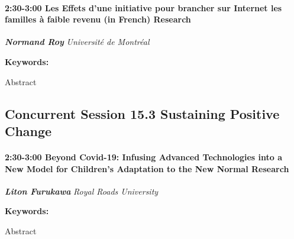 \documentclass[
]{book}
\begin{document}
\begin{session}
\hypertarget{les-effets-dune-initiative-pour-brancher-sur-internet-les-familles-uxe0-faible-revenu-in-french-research}{%
\paragraph*{\texorpdfstring{2:30-3:00 \textbar{} \textbf{Les Effets
d'une initiative pour brancher sur Internet les familles à faible revenu
(in French)} \textbar{}
Research}{2:30-3:00 \textbar{} Les Effets d'une initiative pour brancher sur Internet les familles à faible revenu (in French) \textbar{} Research}}\label{les-effets-dune-initiative-pour-brancher-sur-internet-les-familles-uxe0-faible-revenu-in-french-research}}

\textbf{\emph{Normand Roy}} \textbar{} \emph{Université de Montréal}

\textbf{Keywords:}

Abstract
\end{session}

\hypertarget{concurrent-session-15.3-sustaining-positive-change}{%
\subsection*{Concurrent Session 15.3 \textbar{} Sustaining Positive Change}\label{concurrent-session-15.3-sustaining-positive-change}}

\begin{session}
\hypertarget{beyond-covid-19-infusing-advanced-technologies-into-a-new-model-for-childrens-adaptation-to-the-new-normal-research}{%
\paragraph*{\texorpdfstring{2:30-3:00 \textbar{} \textbf{Beyond
Covid-19: Infusing Advanced Technologies into a New Model for Children's
Adaptation to the New Normal} \textbar{}
Research}{2:30-3:00 \textbar{} Beyond Covid-19: Infusing Advanced Technologies into a New Model for Children's Adaptation to the New Normal \textbar{} Research}}\label{beyond-covid-19-infusing-advanced-technologies-into-a-new-model-for-childrens-adaptation-to-the-new-normal-research}}

\textbf{\emph{Liton Furukawa}} \textbar{} \emph{Royal Roads University}

\textbf{Keywords:}

Abstract
\end{session}
\end{document}
